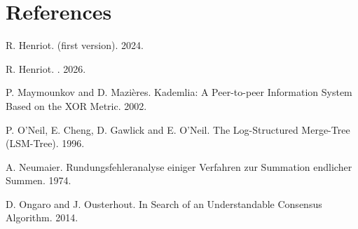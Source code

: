 \documentclass[11pt]{article}
\begin{document}
\section*{References}
\small
\begin{enumerate}[label={[\arabic*]},leftmargin=2em,itemsep=1pt]
  \item \hypertarget{reference:1}{}R. Henriot.  (first version). 2024.
  \item \hypertarget{reference:2}{}R. Henriot. . 2026.
  \item \hypertarget{reference:3}{}P. Maymounkov and D. Mazi\`eres. Kademlia: A Peer-to-peer Information System Based on the XOR Metric. 2002.
  \item \hypertarget{reference:4}{}P. O'Neil, E. Cheng, D. Gawlick and E. O'Neil. The Log-Structured Merge-Tree (LSM-Tree). 1996.
  \item \hypertarget{reference:5}{}A. Neumaier. Rundungsfehleranalyse einiger Verfahren zur Summation endlicher Summen. 1974.
  \item \hypertarget{reference:6}{}D. Ongaro and J. Ousterhout. In Search of an Understandable Consensus Algorithm. 2014.
\end{enumerate}
\end{document}

